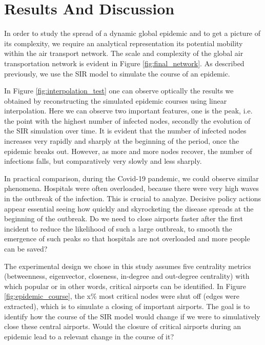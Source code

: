 \documentclass{Template resources/netsci-project}
\begin{document}

\section{Results And Discussion}
In order to study the spread of a dynamic global epidemic and to get a picture of its complexity, we require an analytical representation its potential mobility within the air transport network. The scale and complexity of the global air transportation network is evident in Figure \ref{fig:final_network}. As described previously, we use the SIR model to simulate the course of an epidemic.

In Figure \ref{fig:interpolation_test} one can observe optically the results we obtained by reconstructing the simulated epidemic courses using linear interpolation. Here we can observe two important features, one is the peak, i.e. the point with the highest number of infected nodes, secondly the evolution of the SIR simulation over time.
It is evident that the number of infected nodes increases very rapidly and sharply at the beginning of the period, once the epidemic breaks out. However, as more and more nodes recover, the number of infections falls, but comparatively very slowly and less sharply. 

In practical comparison, during the Covid-19 pandemic, we could observe similar phenomena. Hospitals were often overloaded, because there were very high waves in the outbreak of the infection. This is crucial to analyze. Decisive policy actions appear essential seeing how quickly and skyrocketing the disease spreads at the beginning of the outbreak. Do we need to close airports faster after the first incident to reduce the likelihood of such a large outbreak, to smooth the emergence of such peaks so that hospitals are not overloaded and more people can be saved?

The experimental design we chose in this study assumes five centrality metrics (betweenness, eigenvector, closeness, in-degree and out-degree centrality) with which popular or in other words, critical airports can be identified. 
In Figure \ref{fig:epidemic_course}, the x\% most critical nodes were shut off (edges were extracted), which is to simulate a closing of important airports. The goal is to identify how the course of the SIR model would change if we were to simulatively close these central airports. Would the closure of critical airports during an epidemic lead to a relevant change in the course of it?
\end{document}
